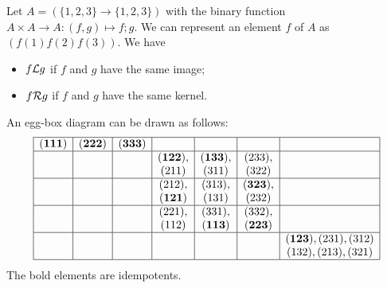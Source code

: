 \begin{example}
Let $A = (\{1,2,3\} \to \{1,2,3\})$ with the binary function $A\times A \to A: (f,g)\mapsto f;g$. We can represent an element $f$ of $A$ as $(f(1) f(2) f(3))$. We have
\begin{itemize}
\item $f\mathcal{L} g$ if $f$ and $g$ have the same image;
\item $f\mathcal{R} g$ if $f$ and $g$ have the same kernel.
\end{itemize}
An egg-box diagram can be drawn as follows:
\[ \begin{array}{|c|c|c|c|c|c|c|}
\hline
\mathbf{(1 1 1)} & \mathbf{(2 2 2)} & \mathbf{(3 3 3)} &&& &  \\ \hline
&& & \mathbf{(1 2 2)}, & \mathbf{(1 3 3)}, & (2 3 3), &  \\
&& & (2 1 1)  & (3 1 1)  & (3 2 2)  &  \\ \hline
&& & (2 1 2), & (3 1 3), & \mathbf{(3 2 3)},  &  \\
&& & \mathbf{(1 2 1)}  & (1 3 1)  & (2 3 2)  &  \\ \hline
&& & (2 2 1), & (3 3 1), & (3 3 2),  &  \\
&& & (1 1 2)  & \mathbf{(1 1 3)}  & \mathbf{(2 2 3)}  &  \\ \hline
&& &&& & \mathbf{(1 2 3)}, (2 3 1), (3 1 2)  \\
&& &&& & (1 3 2), (2 1 3), (3 2 1)  \\ \hline
\end{array} \]
The bold elements are idempotents.
\end{example}


